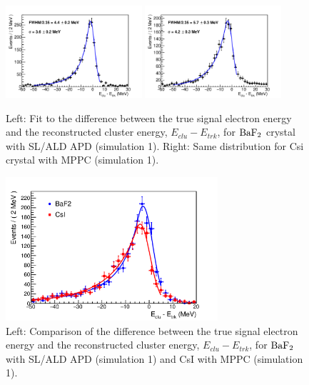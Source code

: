 \begin{figure}[htb]
\begin{center}
   \includegraphics[width=0.45\textwidth]{Figures/baf2_1_fit.pdf} \includegraphics[width=0.45\textwidth]{Figures/csi_1_fit.pdf} 
\end{center}
\caption
{Left: Fit to the difference between the true signal electron energy and the reconstructed cluster energy, $E_{clu}-E_{trk}$, 
for $\rm BaF_2$ crystal with SL/ALD APD (simulation 1). Right: Same distribution for Csi crystal with MPPC (simulation 1).}
\label{sim::fig::fits}
\end{figure}


\begin{figure}[htb]
\begin{center}
   \includegraphics[width=0.7\textwidth]{Figures/compFit1.pdf}
\end{center}
\caption
{Left: Comparison of the difference between the true signal electron energy and the reconstructed cluster energy, $E_{clu}-E_{trk}$, 
for $\rm BaF_2$ with SL/ALD APD (simulation 1) and CsI with MPPC (simulation 1).}
\label{sim::fig::fitsBaCsi}
\end{figure}

